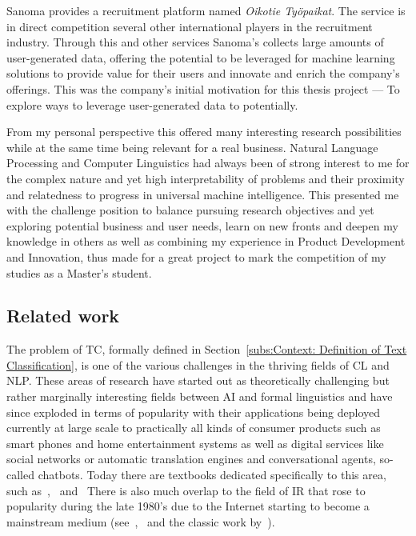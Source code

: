Sanoma provides a recruitment platform named \emph{Oikotie Työpaikat}. The service is in direct competition several other international players in the recruitment industry. Through this and other services Sanoma's collects large amounts of user-generated data, offering the potential to be leveraged for machine learning solutions to provide value for their users and innovate and enrich the company's offerings.
This was the company's initial motivation for this thesis project --- To explore ways to leverage user-generated data to potentially.



From my personal perspective this offered many interesting research possibilities while at the same time being relevant for a real business. Natural Language Processing and Computer Linguistics had always been of strong interest to me for the complex nature and yet high interpretability of problems and their proximity and relatedness to progress in universal machine intelligence. This presented me with the challenge position to balance pursuing research objectives and yet exploring potential business and user needs, learn on new fronts and deepen my knowledge in others as well as combining my experience in Product Development and Innovation, thus made for a great project to mark the competition of my studies as a Master's student.


\subsection{Related work}

The problem of \gls{TC}, formally defined in Section~\ref{subs:Context: Definition of Text Classification}, is one of the various challenges in the thriving fields of \gls{CL} and \gls{NLP}. These areas of research have started out as theoretically challenging but rather marginally interesting fields between \gls{AI} and formal linguistics and have since exploded in terms of popularity with their applications being deployed currently at large scale to practically all kinds of consumer products such as smart phones and home entertainment systems as well as digital services like social networks or automatic translation engines and conversational agents, so-called chatbots.
Today there are textbooks dedicated specifically to this area, such as~\cite{Manning:1999aa},~\cite{Jurafsky:2014aa} and~\cite{Clark:2013aa} There is also much overlap to the field of \gls{IR} that rose to popularity during the late 1980's due to the Internet starting to become a mainstream medium (see~\cite{Manning:2008aa},~\cite{Leskovec:2014aa} and the classic work by~\cite{Rijsbergen:1979aa}).

